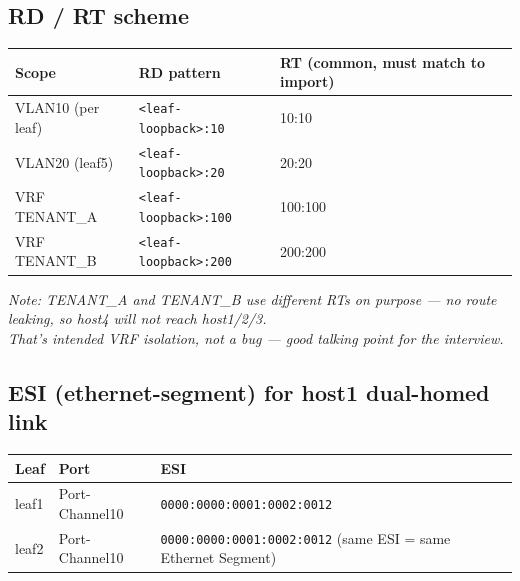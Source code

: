 \documentclass[11pt]{article}
\begin{document}
\vspace{0.2cm}

\subsection*{RD / RT scheme}

\begin{tabular}{lll}
\toprule
\textbf{Scope} & \textbf{RD pattern} & \textbf{RT (common, must match to import)} \\
\midrule
VLAN10 (per leaf) & \texttt{<leaf-loopback>:10}  & 10:10 \\
VLAN20 (leaf5)     & \texttt{<leaf-loopback>:20}  & 20:20 \\
VRF TENANT\_A       & \texttt{<leaf-loopback>:100} & 100:100 \\
VRF TENANT\_B       & \texttt{<leaf-loopback>:200} & 200:200 \\
\bottomrule
\end{tabular}

\vspace{0.2cm}

{\small
\noindent
\textit{Note: TENANT\_A and TENANT\_B use different RTs on purpose --- no route leaking, so host4 will not reach host1/2/3.}\\
\textit{That's intended VRF isolation, not a bug --- good talking point for the interview.}
}

\subsection*{ESI (ethernet-segment) for host1 dual-homed link}

\begin{tabular}{lll}
\toprule
\textbf{Leaf} & \textbf{Port} & \textbf{ESI} \\
\midrule
leaf1 & Port-Channel10 & \texttt{0000:0000:0001:0002:0012} \\
leaf2 & Port-Channel10 & \texttt{0000:0000:0001:0002:0012} (same ESI = same Ethernet Segment) \\
\bottomrule
\end{tabular}
\end{document}
